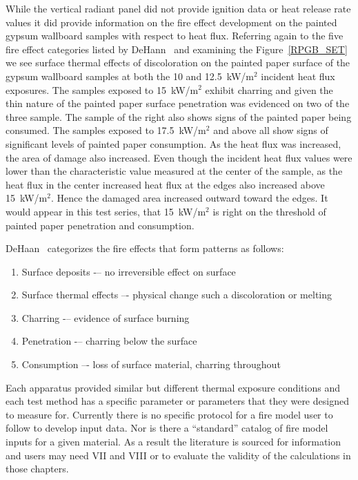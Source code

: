 \documentclass[twoside]{uocthesis}
\begin{document}
While the vertical radiant panel did not provide ignition data or heat release rate values it did provide information on the fire effect development on the painted gypsum wallboard samples with respect to heat flux.  Referring again to the five fire effect categories listed by DeHann~\cite{DeHaan:2012} and examining the Figure~\ref{RPGB_SET} we see surface thermal effects of discoloration on the painted paper surface of the gypsum wallboard samples at both the 10 and 12.5~kW/m$^2$ incident heat flux exposures.  The samples exposed to 15~kW/m$^2$ exhibit charring and given the thin nature of the painted paper surface penetration was evidenced on two of the three sample.  The sample of the right also shows signs of the painted paper being consumed.  The samples exposed to 17.5~kW/m$^2$ and above all show signs of significant levels of painted paper consumption.  As the heat flux was increased, the area of damage also increased. Even though the incident heat flux values were lower than the characteristic value measured at the center of the sample, as the heat flux in the center increased heat flux at the edges also increased above 15~kW/m$^2$. Hence the damaged area increased outward toward the edges. It would appear in this test series, that 15~kW/m$^2$ is right on the threshold of painted paper penetration and consumption.             


DeHaan~\cite{DeHaan:2012} categorizes the fire effects that form patterns as follows:
\begin{enumerate}
	\item Surface deposits -– no irreversible effect on surface
	\item Surface thermal effects –- physical change such a discoloration or melting
	\item Charring -– evidence of surface burning
	\item Penetration -– charring below the surface
	\item Consumption –- loss of surface material, charring throughout
\end{enumerate}

Each apparatus provided similar but different thermal exposure conditions and each test method has a specific parameter or parameters that they were designed to measure for. Currently there is no specific protocol for a fire model user to follow to develop input data.  Nor is there a ``standard'' catalog of fire model inputs for a given material.  As a result the literature is sourced for information and users may need VII and VIII or to evaluate the validity of the calculations in those chapters.     
\end{document}
